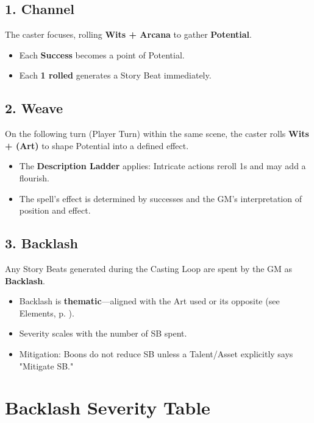\subsection*{1. Channel}

The caster focuses, rolling \textbf{Wits + Arcana}  to gather \textbf{Potential}.

\begin{itemize}
  \item Each \textbf{Success} becomes a point of Potential.
  \item Each \textbf{1 rolled} generates a Story Beat immediately.
\end{itemize}

\subsection*{2. Weave}

On the following turn (Player Turn) within the same scene, the caster rolls \textbf{Wits + (Art)} to shape Potential into a defined effect.

\begin{itemize}
  \item The \textbf{Description Ladder}  applies: Intricate actions reroll 1s and may add a flourish.
  \item The spell's effect is determined by successes and the GM's interpretation of position and effect.
\end{itemize}

\subsection*{3. Backlash}

Any Story Beats generated during the Casting Loop are spent by the GM as \textbf{Backlash}.

\begin{itemize}
  \item Backlash is \textbf{thematic}—aligned with the Art used or its opposite (see Elements, p. \pageref{ch:elements}).
  \item Severity scales with the number of SB spent.
  \item Mitigation: Boons  do not reduce SB unless a Talent/Asset explicitly says "Mitigate SB."
\end{itemize}

\section{Backlash Severity Table}

